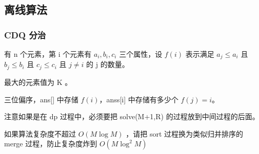 \documentclass[UTF8]{ctexart}
\begin{document}
\subsection{离线算法}

\subsubsection{CDQ 分治}

有 n 个元素，第 i 个元素有 $a_i,b_i,c_i$ 三个属性，设 $f(i)$ 表示满足 $a_j \leq a_i$ 且 $b_j \leq b_i$ 且 $c_j \leq c_i$ 且 $j \ne i$ 的 j 的数量。

最大的元素值为 K 。

三位偏序，ans[] 中存储 $f(i)$，anss[i] 中存储有多少个 $f(j) = i$。

注意如果是在 dp 过程中，必须要把 solve(M+1,R) 的过程放到中间过程的后面。

如果算法复杂度不超过 $O(M \log M)$ ，请把 sort 过程换为类似归并排序的 merge 过程，防止复杂度炸到 $O(M \log^2 M)$
\end{document}

